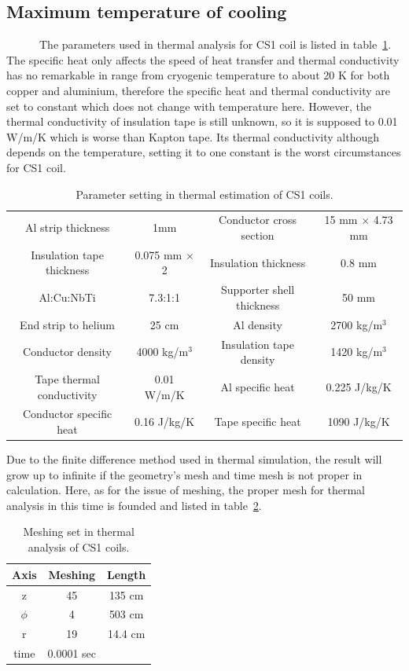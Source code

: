   \subsection{Maximum temperature of cooling}
~~~~~~The parameters used in thermal analysis for CS1 coil is listed in table~\ref{para}.
The specific heat only affects the speed of heat transfer and thermal conductivity has no remarkable in range from cryogenic temperature to about 20 K for both copper and aluminium, therefore the specific heat and thermal conductivity are set to constant which does not change with temperature here.
However, the thermal conductivity of insulation tape is still unknown, so it is supposed to 0.01 W/m/K which is worse than Kapton tape.
Its thermal conductivity although depends on the temperature, setting it to one constant is the worst circumstances for CS1 coil.
 \begin{table}[H]
  \centering
  \begin{tabular}{cccc} \hline \hline
   Al strip thickness & 1mm & Conductor cross section & 15 mm $\times$ 4.73 mm \\
   Insulation tape thickness & 0.075 mm $\times$ 2 & Insulation thickness & 0.8 mm \\
   Al:Cu:NbTi & 7.3:1:1 & Supporter shell thickness & 50 mm \\
   End strip to helium & 25 cm & Al density & 2700 kg/m$^3$ \\
   Conductor density & 4000 kg/m$^3$ & Insulation tape density & 1420 kg/m$^3$ \\
   Tape thermal conductivity & 0.01 W/m/K & Al specific heat & 0.225 J/kg/K \\
   Conductor specific heat & 0.16 J/kg/K & Tape specific heat & 1090 J/kg/K \\ \hline \hline
  \end{tabular}
 \caption{Parameter setting in thermal estimation of CS1 coils.}
 \label{para}
 \end{table}
Due to the finite difference method used in thermal simulation, the result will grow up to infinite if the geometry's mesh and time mesh is not proper in calculation.
Here, as for the issue of meshing, the proper mesh for thermal analysis in this time is founded and listed in table~\ref{4mesh}.
 \begin{table}[H]
  \centering
  \begin{tabular}{ccc} \hline \hline
   Axis & Meshing & Length \\ \hline
   z & 45 & 135 cm \\
   $\phi$ & 4 & 503 cm \\
   r & 19 & 14.4 cm \\
   time & 0.0001 sec & \\ \hline \hline
  \end{tabular}
  \caption{Meshing set in thermal analysis of CS1 coils.}
  \label{4mesh}
 \end{table}
